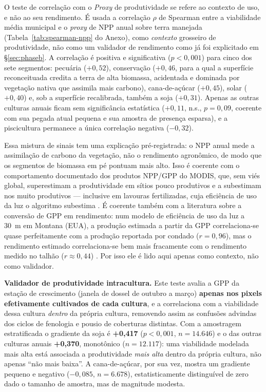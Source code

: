 O teste de correlação com o \emph{Proxy} de produtividade se refere ao contexto de uso, e não ao seu rendimento.
É usada a correlação
$\rho$ de Spearman entre a viabilidade média municipal e o \emph{proxy} de NPP anual sobre
terra manejada (Tabela~\ref{tab:spearman-npp} do Anexo), como \emph{contexto} grosseiro de
produtividade, não como um validador de rendimento como já foi explicitado em \S\ref{sec:phaseb}. A
correlação é positiva e significativa ($p<0{,}001$) para cinco dos sete segmentos: pecuária
($+0{,}52$), conservação ($+0{,}46$, para a qual a superfície reconceituada credita a terra
de alta biomassa, acidentada e dominada por vegetação nativa que assimila mais carbono),
cana-de-açúcar ($+0{,}45$), solar ($+0{,}40$) e, sob a superfície recalibrada, também a soja
($+0{,}31$). Apenas as outras culturas anuais ficam sem significância estatística ($+0{,}11$,
n.s., $p=0{,}09$, coerente com sua pegada atual pequena e sua amostra de presença esparsa),
e a piscicultura permanece a única correlação negativa ($-0{,}32$).

Essa mistura de sinais tem uma explicação pré-registrada: o NPP anual mede a assimilação de
carbono da vegetação, não o rendimento agronômico, de modo que os segmentos de biomassa em pé
pontuam mais alto. Isso é coerente com o comportamento documentado dos produtos NPP/GPP do
MODIS, que, sem viés global, superestimam a produtividade em sítios pouco produtivos e a subestimam
nos muito produtivos --- inclusive em lavouras fertilizadas, cuja eficiência de uso da luz o
algoritmo subestima \citep[pp.~286, 288--289]{turner_evaluation_2006}. É coerente também com a
literatura sobre a conversão de GPP em rendimento: num modelo de eficiência de uso da luz a 30~m em
Montana (EUA), a produção estimada a partir da GPP correlaciona-se quase perfeitamente com a produção
reportada por condado ($r = 0{,}96$), mas o rendimento estimado correlaciona-se bem mais fracamente
com o rendimento medido no talhão ($r \approx 0{,}44$) \citep[p.~16]{he_regional_2018}. Por isso ele é lido aqui apenas como contexto, não como validador.

\textbf{Validador de produtividade intracultura.} Este teste avalia a GPP da estação de
crescimento (janela de dossel de outubro a março) \textbf{apenas nos pixels efetivamente
cultivados de cada cultura}, e a correlaciona com a viabilidade dessa cultura \emph{dentro} da
própria cultura, removendo assim as confusões advindas dos ciclos de fenologia e pousio
de coberturas distintas. Com a amostragem estratificada o gradiente da soja é
\textbf{+0,417} ($p<0{,}001$, $n = 14.646$) e o das outras culturas anuais \textbf{+0,370},
monotônico ($n = 12.117$): uma viabilidade modelada mais alta está associada a produtividade
\emph{mais alta} dentro da própria cultura, não apenas ``não mais baixa''. A cana-de-açúcar, por sua vez, mostra um gradiente pequeno e negativo ($-0{,}085$,
$n = 6.678$), estatisticamente distinguível de zero dado o tamanho de amostra, mas de
magnitude modesta.


